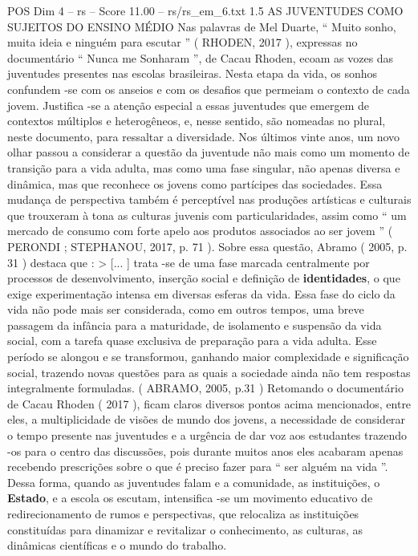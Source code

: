\begin{textsample}{POS Dim 4 – rs – Score 11.00 – rs/rs\_em\_6.txt}  \label{ex:f4_pos_092}
1.5 AS JUVENTUDES COMO SUJEITOS DO ENSINO MÉDIO Nas palavras de Mel Duarte, “ Muito sonho, muita ideia e ninguém para escutar ” ( RHODEN, 2017 ), expressas no documentário “ Nunca me Sonharam ”, de Cacau Rhoden, ecoam as vozes das juventudes presentes nas escolas brasileiras.
Nesta etapa da vida, os sonhos confundem -se com os anseios e com os desafios que permeiam o contexto de cada jovem.
Justifica -se a atenção especial a essas juventudes que emergem de contextos múltiplos e heterogêneos, e, nesse sentido, são nomeadas no plural, neste documento, para ressaltar a diversidade.
Nos últimos vinte anos, um novo olhar passou a considerar a questão da juventude não mais como um momento de transição para a vida adulta, mas como uma fase singular, não apenas diversa e dinâmica, mas que reconhece os jovens como partícipes das sociedades.
Essa mudança de perspectiva também é perceptível nas produções artísticas e culturais que trouxeram à tona as culturas juvenis com particularidades, assim como “ um mercado de consumo com forte apelo aos produtos associados ao ser jovem ” ( PERONDI ; STEPHANOU, 2017, p. 71 ).
Sobre essa questão, Abramo ( 2005, p. 31 ) destaca que : > [... ] trata -se de uma fase marcada centralmente por processos de desenvolvimento, inserção social e definição de \textbf{identidades}, o que exige experimentação intensa em diversas esferas da vida.
Essa fase do ciclo da vida não pode mais ser considerada, como em outros tempos, uma breve passagem da infância para a maturidade, de isolamento e suspensão da vida social, com a tarefa quase exclusiva de preparação para a vida adulta.
Esse período se alongou e se transformou, ganhando maior complexidade e significação social, trazendo novas questões para as quais a sociedade ainda não tem respostas integralmente formuladas. ( ABRAMO, 2005, p.31 ) Retomando o documentário de Cacau Rhoden ( 2017 ), ficam claros diversos pontos acima mencionados, entre eles, a multiplicidade de visões de mundo dos jovens, a necessidade de considerar o tempo presente nas juventudes e a urgência de dar voz aos estudantes trazendo -os para o centro das discussões, pois durante muitos anos eles acabaram apenas recebendo prescrições sobre o que é preciso fazer para “ ser alguém na vida ”.
Dessa forma, quando as juventudes falam e a comunidade, as instituições, o \textbf{Estado}, e a escola os escutam, intensifica -se um movimento educativo de redirecionamento de rumos e perspectivas, que relocaliza as instituições constituídas para dinamizar e revitalizar o conhecimento, as culturas, as dinâmicas científicas e o mundo do trabalho.

\end{textsample}
